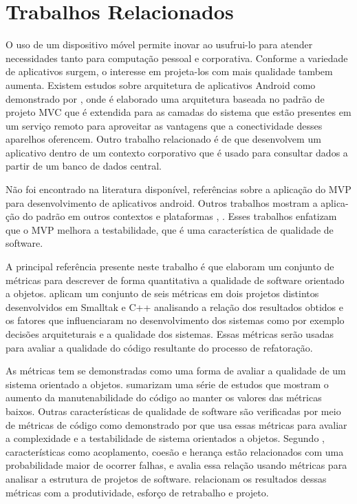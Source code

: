 \documentclass[conference]{IEEEtran}
\begin{document}
\section{Trabalhos Relacionados}

O uso de um dispositivo móvel permite inovar ao usufrui-lo para atender
necessidades tanto para computação pessoal e corporativa. Conforme a variedade
de aplicativos surgem, o interesse em projeta-los com mais qualidade tambem
aumenta. Existem estudos sobre arquitetura de aplicativos Android como
demonstrado por \cite{BMVC}, onde é elaborado uma arquitetura baseada no
padrão de projeto MVC que é extendida para as camadas do sistema que estão
presentes em um serviço remoto para aproveitar as vantagens que a conectividade
desses aparelhos oferencem. Outro trabalho relacionado é
de \cite{corporateandroid} que desenvolvem um aplicativo dentro de um
contexto corporativo que é usado para consultar dados a partir de um banco de
dados central.

Não foi encontrado na literatura disponível, referências sobre a aplicação do
MVP para desenvolvimento de aplicativos android. Outros trabalhos mostram a
aplica- ção do padrão em outros contextos e plataformas  \cite{presenterfirst},
\cite{yangmvp}. Esses trabalhos enfatizam que o MVP melhora a
testabilidade, que é uma característica de qualidade de software.

A principal referência presente neste trabalho é \cite{cksuite} que
elaboram um conjunto de métricas para descrever de forma quantitativa a
qualidade de software orientado a objetos. \cite{cksuite} aplicam um
conjunto de seis métricas em dois projetos distintos desenvolvidos em Smalltak e
C++ analisando a relação dos resultados obtidos e os fatores que influenciaram
no desenvolvimento dos sistemas como por exemplo decisões arquiteturais e a
qualidade dos sistemas. Essas métricas serão usadas para avaliar a qualidade do
código resultante do processo de refatoração.

As métricas \cite{cksuite} tem se demonstradas como uma forma de avaliar a
qualidade de um sistema orientado a objetos. \cite{Dubey:2011} sumarizam
uma série de estudos que mostram o aumento da manutenabilidade do código ao
manter os valores das métricas baixos. Outras características de
qualidade de software são verificadas por meio de métricas de código
como demonstrado por \cite{Khalid:2010} que usa essas métricas para
avaliar a complexidade e a testabilidade de sistema orientados a objetos.
Segundo \cite{Briand:2000}, características como acoplamento, coesão e
herança estão relacionados com uma probabilidade maior de ocorrer falhas, e
avalia essa relação usando métricas para analisar a estrutura de projetos de
software. \cite{CK:98} relacionam os resultados dessas métricas com a
produtividade, esforço de retrabalho e projeto.
\end{document}
